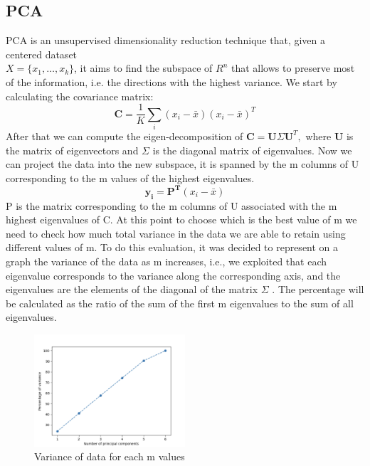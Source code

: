 \documentclass{article}
\begin{document}
\subsection{PCA}
PCA is an unsupervised dimensionality reduction technique that, given a centered dataset \\\(X = \{x_1, \ldots, x_k\}\), it aims to find the subspace of \(R^n\) that allows to preserve most of the information, i.e. the directions with the highest variance.
We start by calculating the covariance matrix:
\begin{equation}
\mathbf{C} = \frac{1}{K} \sum_{i} (x_i - \bar{x})(x_i - \bar{x})^T
\end{equation}
After that we can compute the eigen-decomposition of \(
\mathbf{C} = \mathbf{U} \Sigma \mathbf{U}^T,
\)
where \( \mathbf{U} \) is the matrix of eigenvectors and \( \Sigma  \) is the diagonal matrix of eigenvalues. Now we can project the data into the new subspace, it is spanned by the m columns of U corresponding to the m values of the highest eigenvalues.\\
\begin{equation}
\mathbf{y_i} = \mathbf{P^T} (x_i - \bar{x})
\end{equation}
P is the matrix corresponding to the m columns of U associated with the m highest eigenvalues of C.
At this point to choose which is the best value of m we need to check how much total variance in the data we are able to retain using different values of m.
To do this evaluation, it was decided to represent on a graph the variance of the data as m increases, i.e., we exploited that each eigenvalue corresponds to the variance along the corresponding axis, and the eigenvalues are the elements of the diagonal of the matrix \(\Sigma\) . The percentage will be calculated as the ratio of the sum of the first m eigenvalues to the sum of all eigenvalues.
\begin{figure}[H]
    \centering
    \includegraphics[width=0.5\textwidth]{./img/variance.png}
    \caption{Variance of data for each m values}
    \label{fig:variance}
\end{figure} 
\end{document}
